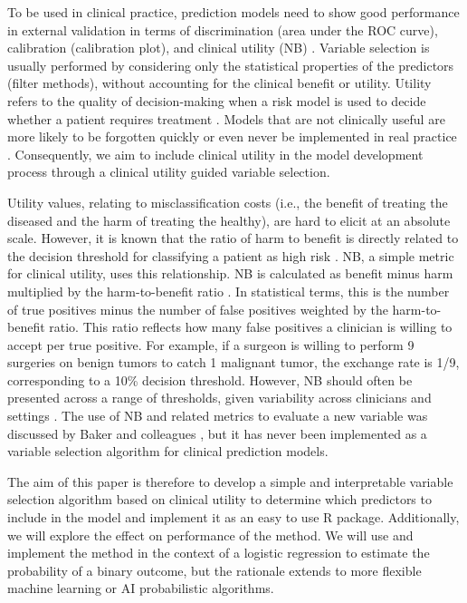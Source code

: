 To be used in clinical practice, prediction models need to show good performance in external validation in terms of discrimination (area under the ROC curve), calibration (calibration plot), and clinical utility (\gls{NB}) \cite{calsterPerformanceEvaluationPredictive2024}. Variable selection is usually performed by considering only the statistical properties of the predictors (filter methods), without accounting for the clinical benefit or utility. Utility refers to the quality of decision-making when a risk model is used to decide whether a patient requires treatment \cite{vancalsterReportingInterpretingDecision2018}. Models that are not clinically useful are more likely to be forgotten quickly or even never be implemented in real practice \cite{wyattCommentaryPrognosticModels1995}. Consequently, we aim to include clinical utility in the model development process through a clinical utility guided variable selection.

Utility values, relating to misclassification costs (i.e., the benefit of treating the diseased and the harm of treating the healthy), are hard to elicit at an absolute scale. However, it is known that the ratio of harm to benefit is directly related to the decision threshold for classifying a patient as high risk \cite{vancalsterReportingInterpretingDecision2018}. \gls{NB}, a simple metric for clinical utility, uses this relationship. \Gls{NB} is calculated as benefit minus harm multiplied by the harm-to-benefit ratio \cite{vickersDecisionCurveAnalysis2006}. In statistical terms, this is the number of true positives minus the number of false positives weighted by the harm-to-benefit ratio. This ratio reflects how many false positives a clinician is willing to accept per true positive. For example, if a surgeon is willing to perform 9 surgeries on benign tumors to catch 1 malignant tumor, the exchange rate is 1/9, corresponding to a 10\% decision threshold. However, \gls{NB} should often be presented across a range of thresholds, given variability across clinicians and settings \cite{vickersSimpleStepbystepGuide2019}. The use of \gls{NB} and related metrics to evaluate a new variable was discussed by Baker and colleagues \cite{bakerEvaluatingNewMarker2012}, but it has never been implemented as a variable selection algorithm for clinical prediction models.

The aim of this paper is therefore to develop a simple and interpretable variable selection algorithm based on clinical utility to determine which predictors to include in the model and implement it as an easy to use R package. Additionally, we will explore the effect on performance of the method. We will use and implement the method in the context of a logistic regression to estimate the probability of a binary outcome, but the rationale extends to more flexible machine learning or AI probabilistic algorithms.

